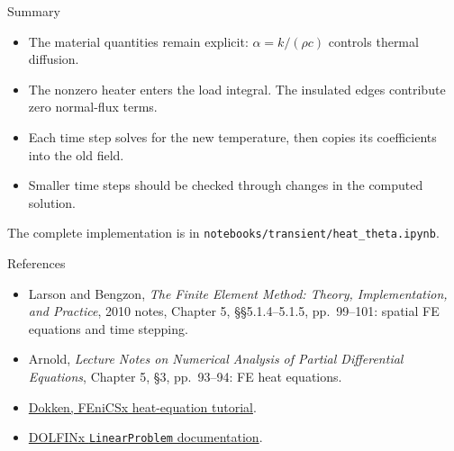 \documentclass[11pt,aspectratio=169]{beamer}
\begin{document}
\begin{frame}{Summary}
\begin{itemize}
\item The material quantities remain explicit:
$\alpha=k/(\rho c)$ controls thermal diffusion.
\item The nonzero heater enters the load integral. The insulated edges
contribute zero normal-flux terms.
\item Each time step solves for the new temperature, then copies its coefficients into the old field.
\item Smaller time steps should be checked through changes in the computed solution.
\end{itemize}
\medskip
The complete implementation is in
\texttt{notebooks/transient/heat\_theta.ipynb}.
\end{frame}

\begin{frame}{References}
\begin{itemize}
\item Larson and Bengzon, \emph{The Finite Element Method: Theory,
Implementation, and Practice}, 2010 notes, Chapter 5,
\S\S5.1.4--5.1.5, pp.~99--101: spatial FE equations and time stepping.
\item Arnold, \emph{Lecture Notes on Numerical Analysis of Partial
Differential Equations}, Chapter 5, \S3, pp.~93--94: FE heat equations.
\item \href{https://jsdokken.com/dolfinx-tutorial/stable/chapter2/heat_code.html}
{Dokken, FEniCSx heat-equation tutorial}.
\item \href{https://docs.fenicsproject.org/dolfinx/v0.11.0/python/generated/dolfinx.fem.petsc.html}
{DOLFINx \texttt{LinearProblem} documentation}.
\end{itemize}
\end{frame}
\end{document}
